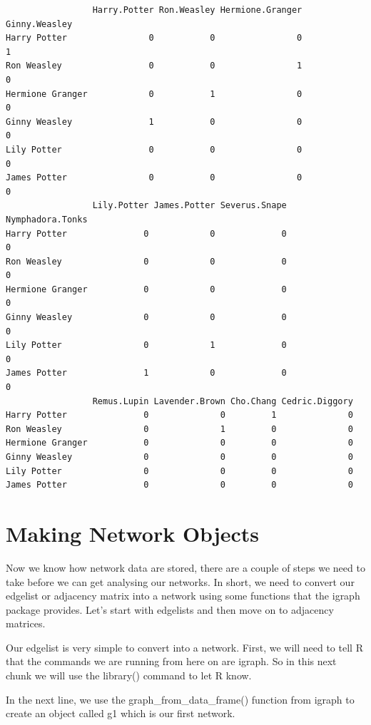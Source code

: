\documentclass[
  letterpaper,
  DIV=11,
  numbers=noendperiod]{scrreprt}
\begin{document}
\begin{verbatim}
                 Harry.Potter Ron.Weasley Hermione.Granger Ginny.Weasley
Harry Potter                0           0                0             1
Ron Weasley                 0           0                1             0
Hermione Granger            0           1                0             0
Ginny Weasley               1           0                0             0
Lily Potter                 0           0                0             0
James Potter                0           0                0             0
                 Lily.Potter James.Potter Severus.Snape Nymphadora.Tonks
Harry Potter               0            0             0                0
Ron Weasley                0            0             0                0
Hermione Granger           0            0             0                0
Ginny Weasley              0            0             0                0
Lily Potter                0            1             0                0
James Potter               1            0             0                0
                 Remus.Lupin Lavender.Brown Cho.Chang Cedric.Diggory
Harry Potter               0              0         1              0
Ron Weasley                0              1         0              0
Hermione Granger           0              0         0              0
Ginny Weasley              0              0         0              0
Lily Potter                0              0         0              0
James Potter               0              0         0              0
\end{verbatim}

\section{Making Network Objects}\label{making-network-objects}

Now we know how network data are stored, there are a couple of steps we
need to take before we can get analysing our networks. In short, we need
to convert our edgelist or adjacency matrix into a network using some
functions that the igraph package provides. Let's start with edgelists
and then move on to adjacency matrices.

Our edgelist is very simple to convert into a network. First, we will
need to tell R that the commands we are running from here on are igraph.
So in this next chunk we will use the library() command to let R know.

In the next line, we use the graph\_from\_data\_frame() function from
igraph to create an object called g1 which is our first network.
\end{document}
